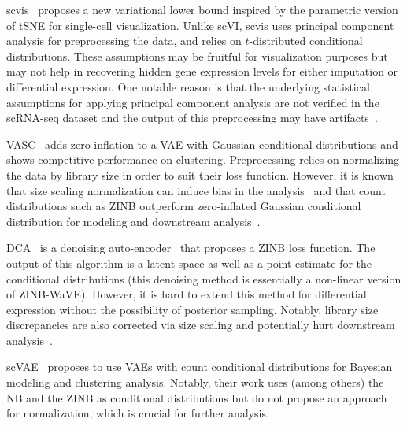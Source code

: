scvis~\cite{scvis} proposes a new variational lower bound inspired by the parametric version of tSNE for single-cell visualization. Unlike scVI, scvis uses principal component analysis for preprocessing the data, and relies on $t$-distributed conditional distributions. These assumptions may be fruitful for visualization purposes but may not help in recovering hidden gene expression levels for either imputation or differential expression. One notable reason is that the underlying statistical assumptions for applying principal component analysis are not verified in the scRNA-seq dataset and the output of this preprocessing may have artifacts~\cite{zinbwave}.

VASC~\cite{VASC} adds zero-inflation to a VAE with Gaussian conditional distributions and shows competitive performance on clustering. Preprocessing relies on normalizing the data by library size in order to suit their loss function. However, it is known that size scaling normalization can induce bias in the analysis~\cite{vallejos2017normalizing} and that count distributions such as ZINB outperform zero-inflated Gaussian conditional distribution for modeling and downstream analysis~\cite{zinbwave, zifa}.

DCA~\cite{dca} is a denoising auto-encoder~\cite{VincentPASCALVINCENT2010} that proposes a ZINB loss function. The output of this algorithm is a latent space as well as a point estimate for the conditional distributions (this denoising method is essentially a non-linear version of ZINB-WaVE). However, it is hard to extend this method for differential expression without the possibility of posterior sampling. Notably, library size discrepancies are also corrected via size scaling and potentially hurt downstream analysis~\cite{vallejos2017normalizing}.

scVAE~\cite{scVAE} proposes to use VAEs with count conditional distributions for Bayesian modeling and clustering analysis. Notably, their work uses (among others) the NB and the ZINB as conditional distributions but do not propose an approach for normalization, which is crucial for further analysis.

